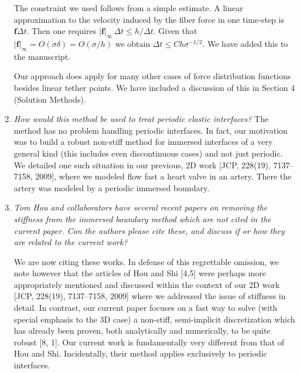 \documentclass[12pt]{article}
\begin{document}
\begin{enumerate}
The constraint we used follows from a simple estimate. A linear approximation to
the velocity induced by the fiber force in one time-step is $\mathbf{f} \Delta t$. Then  one requires $|\mathbf{f}|_{\infty} \, \Delta t \leq h/\Delta t$. Given that $|\mathbf{f}|_{\infty}=O(\sigma \delta)=O(\sigma/h)$ we obtain 
$\Delta t \leq C h\sigma^{-1/2}$.  We have added this to the manuscript. 


Our approach does apply for many other cases of force distribution functions besides linear tether points. We have included a discussion of this in Section 4 (Solution Methods).




\item {\em How would this method be used to treat periodic elastic interfaces?}
 The method has no problem handling periodic interfaces. In fact, our motivation was to build a robust non-stiff method for immersed interfaces of a very general kind (this includes even discontinuous cases) and not just periodic. We detailed one such situation in our previous, 2D work [JCP, 228(19), 7137--7158, 2009], where we modeled flow fast a heart valve in an artery. There the artery was modeled by a periodic immersed boundary.


\item {\em Tom Hou and collaborators have several recent papers on removing the
stiffness from the immersed boundary method which are not cited in the current paper. Can the authors please cite these, and discuss if or how they are related to the current work?}

We are now citing these works. In defense of this regrettable omission, we note however that the articles of Hou and Shi [4,5] were perhaps more appropriately mentioned and discussed within the context of our 2D work [JCP, 228(19), 7137--7158, 2009] where we addressed the issue of  stiffness in detail. In contrast, our current paper focuses on a fast way to solve (with special emphasis to the 3D case)  a non-stiff, semi-implicit discretization which has already been proven, both analytically and numerically, to be quite robust [8, 1]. Our current work is fundamentally very different from that of  Hou and Shi. Incidentally,  their method applies exclusively to periodic interfaces.

\end{enumerate}


 
\end{document}
